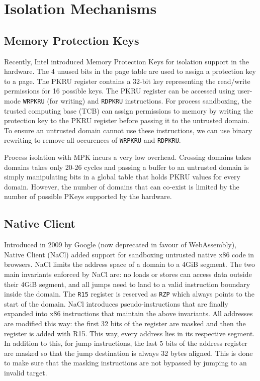 \chapter{Isolation Mechanisms}

\label{Chapter3}



\section{Memory Protection Keys}

Recently, Intel introduced Memory Protection Keys for isolation support in the hardware. The 4 unused bits in the page table are used to assign a protection key to a page.  The PKRU register contains a 32-bit key representing the read/write permissions for 16 possible keys. The PKRU register can be accessed using user-mode \lstinline{WRPKRU} (for writing) and \lstinline{RDPKRU} instructions. For process sandboxing, the trusted computing base (TCB) can assign permissions to memory by writing the protection key to the PKRU register before passing it to the untrusted domain. To ensure an untrusted domain cannot use these instructions, we can use binary rewriting to remove all occurences of \lstinline{WRPKRU} and \lstinline{RDPKRU}.

Process isolation with MPK incurs a very low overhead. Crossing domains takes domains takes only 20-26 cycles \cite{ipc-62, ipc-33} and passing a buffer to an untrusted domain is simply manipulating bits in a global table that holds PKRU values for every domain. However, the number of domains that can co-exist is limited by the number of possible PKeys supported by the hardware.

\section{Native Client}
Introduced in 2009 by Google (now deprecated in favour of WebAssembly), Native Client (NaCl) added support for sandboxing untrusted native x86 code in browsers. NaCl limits the address space of a domain to a 4GiB segment. The two main invariants enforced by NaCl are:  no loads or stores can access data outside their 4GiB segment, and all jumps need to land to a valid instruction boundary inside the domain. The \lstinline{R15} register is reserved as \lstinline{RZP} which always points to the start of the domain. NaCl introduces pseudo-instructions that are finally expanded into x86 instructions that maintain the above invariants. 
All addresses are modified this way: the first 32 bits of the register are masked and then the register is added with R15. This way, every address lies in its respective segment. In addition to this, for jump instructions, the last 5 bits of the address register are masked so that the jump destination is always 32 bytes aligned. This is done to make sure that the masking instructions are not bypassed by jumping to an invalid target. 

